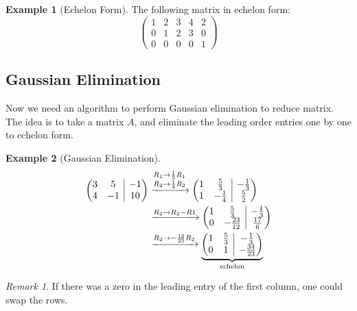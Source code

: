 \documentclass[12pt, a4paper]{article}
\makeatletter
\newenvironment{amatrix}[1]{%
  \left(\begin{array}{@{}*{#1}{c}|c@{}}
}{%
  \end{array}\right)
}
\theoremstyle{remark}
\newtheorem{remark}{Remark}
\theoremstyle{definition}
\newtheorem{example}{Example}
\numberwithin{equation}{section}
\numberwithin{definition}{section}
\numberwithin{example}{section}
\numberwithin{exercise}{section}
\numberwithin{remark}{section}
\numberwithin{figure}{section}
\makeatother
\begin{document}
\begin{example}[Echelon Form]
    The following matrix in echelon form:
    \begin{equation*}
        \begin{pmatrix}
            1 & 2 & 3 & 4 & 2 \\
            0 & 1 & 2 & 3 & 0 \\
            0 & 0 & 0 & 0 & 1
        \end{pmatrix}
    \end{equation*}
\end{example}
\subsection{Gaussian Elimination}
Now we need an algorithm to perform Gaussian elimination to reduce matrix.
The idea is to take a matrix $A$, and eliminate the leading order entries one by one to echelon form.
\begin{example}[Gaussian Elimination]
    \begin{align*}
        \begin{amatrix}{2}
            3 & 5 & -1 \\
            4 & -1 & 10
        \end{amatrix}
        & \xrightarrow{\substack{R_1 \rightarrow \frac{1}{3} R_1 \\ R_2 \rightarrow \frac{1}{4} R_2}}
        \begin{amatrix}{2}
            1 & \frac{5}{3} & -\frac{1}{3} \\
            1 & -\frac{1}{4} & \frac{5}{2}
        \end{amatrix}
        \\
        & \xrightarrow{R_2 \rightarrow R_2 - R1}
        \begin{amatrix}{2}
            1 & \frac{5}{3} & -\frac{1}{3} \\
            0 & -\frac{23}{12} & \frac{17}{6}
        \end{amatrix} \\
        & \xrightarrow{R_2 \rightarrow -\frac{12}{23}R_2}
        \underbrace{
        \begin{amatrix}{2}
            1 & \frac{5}{3} & -\frac{1}{3} \\
            0 & 1 & -\frac{34}{23}
    \end{amatrix}}_{\text{echelon}}
    \end{align*}
\end{example}
\begin{remark}
    If there was a zero in the leading entry of the first column, one could swap the rows.
\end{remark}
\end{document}
